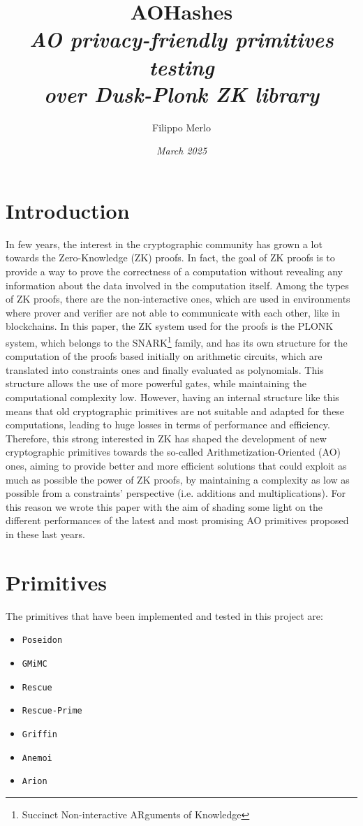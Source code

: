 \documentclass[12pt, a4paper]{report}
\title{{\textbf{AOHashes}}\\[20pt]\textsl{AO privacy-friendly primitives testing\\over Dusk-Plonk ZK library}}
\author{\Large{Filippo Merlo}}
\date{\textit{March 2025}}
\begin{document}
\maketitle
\newpage
{}
\tableofcontents
\pagebreak

\chapter{Introduction}\label{chap:intro}

In few years, the interest in the cryptographic community has grown a lot towards the Zero-Knowledge (ZK) proofs. In fact, the goal of ZK proofs is to provide a way to prove the correctness of a computation without revealing any information about the data involved in the computation itself. Among the types of ZK proofs, there are the non-interactive ones, which are used in environments where prover and verifier are not able to communicate with each other, like in blockchains. In this paper, the ZK system used for the proofs is the PLONK system, which belongs to the SNARK\footnote{Succinct Non-interactive ARguments of Knowledge} family, and has its own structure for the computation of the proofs based initially on arithmetic circuits, which are translated into constraints ones and finally evaluated as polynomials. This structure allows the use of more powerful gates, while maintaining the computational complexity low.
However, having an internal structure like this means that old cryptographic primitives are not suitable and adapted for these computations, leading to huge losses in terms of performance and efficiency. Therefore, this strong interested in ZK has shaped the development of new cryptographic primitives towards the so-called Arithmetization-Oriented (AO) ones, aiming to provide better and more efficient solutions that could exploit as much as possible the power of ZK proofs, by maintaining a complexity as low as possible from a constraints' perspective (i.e. additions and multiplications). For this reason we wrote this paper with the aim of shading some light on the different performances of the latest and most promising AO primitives proposed in these last years.

\chapter{Primitives}\label{chap:primitives}

The primitives that have been implemented and tested in this project are:
\begin{itemize}
  \item \texttt{Poseidon}
  \item \texttt{GMiMC}
  \item \texttt{Rescue}
  \item \texttt{Rescue-Prime}
  \item \texttt{Griffin}
  \item \texttt{Anemoi}
  \item \texttt{Arion}
\end{itemize}
\end{document}
